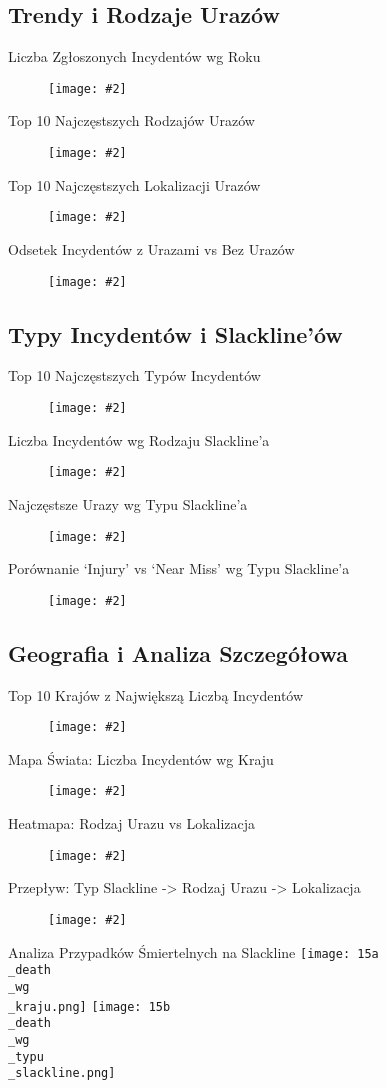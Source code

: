 \documentclass[10pt]{beamer} %
\newcommand{\fullslideimage}[3][width=\textwidth,height=0.75\textheight,keepaspectratio]{
  \begin{frame}{#3} %
    \begin{figure}
      \centering
      \texttt{[image: \#2]} %
    \end{figure}
  \end{frame}
}
\begin{document}
\subsection{Trendy i Rodzaje Urazów}
\fullslideimage{01\_incydenty\_lata.png}{Liczba Zgłoszonych Incydentów wg Roku}
\fullslideimage{02\_top10\_rodzaje\_urazow.png}{Top 10 Najczęstszych Rodzajów Urazów}
\fullslideimage{03\_top10\_lokalizacje\_urazow.png}{Top 10 Najczęstszych Lokalizacji Urazów}
\fullslideimage{07\_odsetek\_urazy\_vs\_bez.png}{Odsetek Incydentów z Urazami vs Bez Urazów}

\subsection{Typy Incydentów i Slackline'ów}
\fullslideimage{04\_top10\_typy\_incydentow.png}{Top 10 Najczęstszych Typów Incydentów}
\fullslideimage{05\_incydenty\_rodzaj\_slackline.png}{Liczba Incydentów wg Rodzaju Slackline'a}
\fullslideimage{08\_urazy\_wg\_typu\_slackline.png}{Najczęstsze Urazy wg Typu Slackline'a}
\fullslideimage{12\_injury\_vs\_nearmiss\_typ\_slackline.png}{Porównanie `Injury' vs `Near Miss' wg Typu Slackline'a}

\subsection{Geografia i Analiza Szczegółowa}
\fullslideimage{06\_top10\_kraje\_incydenty.png}{Top 10 Krajów z Największą Liczbą Incydentów}
\fullslideimage{10\_mapa\_incydenty\_kraje.png}{Mapa Świata: Liczba Incydentów wg Kraju}
\fullslideimage{14\_heatmap\_uraz\_lokalizacja.png}{Heatmapa: Rodzaj Urazu vs Lokalizacja}
\fullslideimage{13\_alluvial\_slack\_uraz\_lok.png}{Przepływ: Typ Slackline -> Rodzaj Urazu -> Lokalizacja}
\begin{frame}{Analiza Przypadków Śmiertelnych na Slackline}
    \texttt{[image: 15a\\\_death\\\_wg\\\_kraju.png]}
    \texttt{[image: 15b\\\_death\\\_wg\\\_typu\\\_slackline.png]}
\end{frame}

\end{document}
